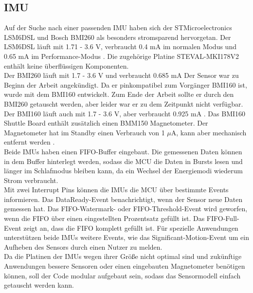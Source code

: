 \subsection{IMU}
Auf der Suche nach einer passenden IMU haben sich der STMicroelectronics LSM6DSL und Bosch BMI260 als besonders stromsparend hervorgetan.
Der LSM6DSL läuft mit 1.71 - 3.6 V, verbraucht 0.4 mA im normalen Modus und 0.65 mA im Performance-Modus \cite{datasheet_lsm6dsl}. Die zugehörige Platine STEVAL-MKI178V2 enthält keine überflüssigen Komponenten.\\
Der BMI260 läuft mit 1.7 - 3.6 V und verbraucht 0.685 mA
Der Sensor war zu Beginn der Arbeit angekündigt.
Da er pinkompatibel zum Vorgänger BMI160 ist, wurde mit dem BMI160 entwickelt.
Zum Ende der Arbeit sollte er durch den BMI260 getauscht werden, aber leider war er zu dem Zeitpunkt nicht verfügbar. \cite{site_bmi260}\\
Der BMI160 läuft auch mit 1.7 - 3.6 V, aber verbraucht 0.925 mA \cite{datasheet_bmi160}.
Das BMI160 Shuttle Board enthält zusätzlich einen BMM150 Magnetometer.
Der Magnetometer hat im Standby einen Verbrauch von 1 $\mu$A, kann aber mechanisch entfernt werden \cite{datasheet_bmm150}.\\
Beide IMUs haben einen FIFO-Buffer eingebaut.
Die gemessenen Daten können in dem Buffer hinterlegt werden, sodass die MCU die Daten in Bursts lesen und länger im Schlafmodus bleiben kann, da ein Wechsel der Energiemodi wiederum Strom verbraucht.\\
Mit zwei Interrupt Pins können die IMUs die MCU über bestimmte Events informieren.
Das DataReady-Event benachrichtigt, wenn der Sensor neue Daten gemessen hat.
Das FIFO-Watermark- oder FIFO-Threshold-Event wird geworfen, wenn die FIFO über einen eingestellten Prozentsatz gefüllt ist.
Das FIFO-Full-Event zeigt an, dass die FIFO komplett gefüllt ist.
Für spezielle Anwendungen unterstützen beide IMUs weitere Events, wie das Significant-Motion-Event um ein Aufheben des Sensors durch einen Nutzer zu melden.\\
Da die Platinen der IMUs wegen ihrer Größe nicht optimal sind und zukünftige Anwendungen bessere Sensoren oder einen eingebauten Magnetometer benötigen können, soll der Code modular aufgebaut sein, sodass das Sensormodell einfach getauscht werden kann.

